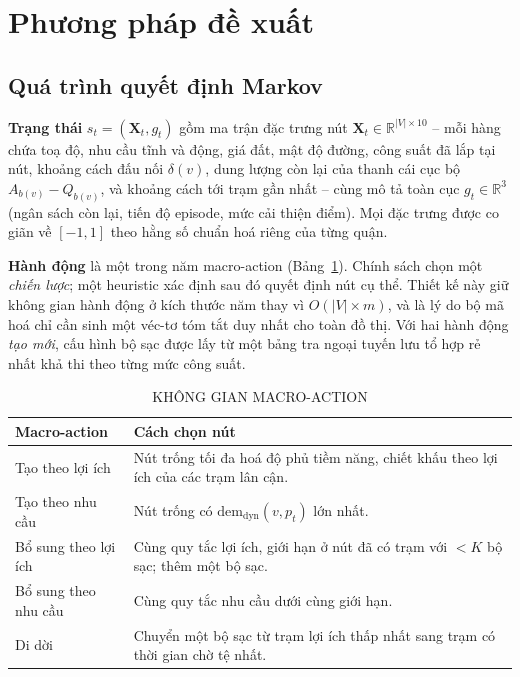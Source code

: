 \documentclass[10pt, conference, a4paper, compsocconf]{IEEEtran}
\begin{document}
\section{Phương pháp đề xuất}
\label{sec:method}

\subsection{Quá trình quyết định Markov}
\label{sec:mdp}

\textbf{Trạng thái} $s_t=(\mathbf{X}_t, g_t)$ gồm ma trận đặc trưng nút
$\mathbf{X}_t\in\mathbb{R}^{|V|\times 10}$ -- mỗi hàng chứa toạ độ, nhu cầu
tĩnh và động, giá đất, mật độ đường, công suất đã lắp tại nút, khoảng cách đấu
nối $\delta(v)$, dung lượng còn lại của thanh cái cục bộ $A_{b(v)}-Q_{b(v)}$,
và khoảng cách tới trạm gần nhất -- cùng mô tả toàn cục $g_t\in\mathbb{R}^3$
(ngân sách còn lại, tiến độ episode, mức cải thiện điểm). Mọi đặc trưng được
co giãn về $[-1,1]$ theo hằng số chuẩn hoá riêng của từng quận.

\textbf{Hành động} là một trong năm macro-action (Bảng~\ref{tab:actions}).
Chính sách chọn một \emph{chiến lược}; một heuristic xác định sau đó quyết
định nút cụ thể. Thiết kế này giữ không gian hành động ở kích thước năm thay
vì $O(|V|\times m)$, và là lý do bộ mã hoá chỉ cần sinh một véc-tơ tóm tắt duy
nhất cho toàn đồ thị. Với hai hành động \emph{tạo mới}, cấu hình bộ sạc được
lấy từ một bảng tra ngoại tuyến lưu tổ hợp rẻ nhất khả thi theo từng mức công
suất.

\begin{table}[!t]
\renewcommand{\arraystretch}{1.1}
\caption{\uppercase{Không gian macro-action}}
\label{tab:actions}
\centering
\footnotesize
\begin{tabular}{@{}p{1.75cm}p{5.0cm}@{}}
\toprule
\textbf{Macro-action} & \textbf{Cách chọn nút} \\
\midrule
Tạo theo lợi ích & Nút trống tối đa hoá độ phủ tiềm năng, chiết khấu theo lợi ích của các trạm lân cận. \\
Tạo theo nhu cầu & Nút trống có $\text{dem}_{\text{dyn}}(v,p_t)$ lớn nhất. \\
Bổ sung theo lợi ích & Cùng quy tắc lợi ích, giới hạn ở nút đã có trạm với $<K$ bộ sạc; thêm một bộ sạc. \\
Bổ sung theo nhu cầu & Cùng quy tắc nhu cầu dưới cùng giới hạn. \\
Di dời & Chuyển một bộ sạc từ trạm lợi ích thấp nhất sang trạm có thời gian chờ tệ nhất. \\
\bottomrule
\end{tabular}
\end{table}
\end{document}

